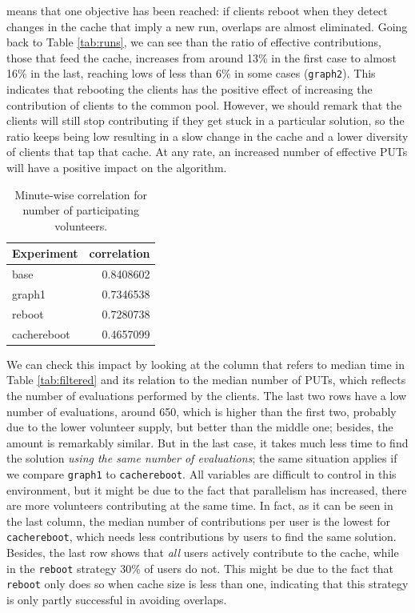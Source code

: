 \documentclass[runningheads,a4paper]{llncs}\usepackage[]{graphicx}\usepackage[]{color}
\newenvironment{knitrout}{}{} %
\begin{document}
means that one objective has been reached: if clients reboot when they
detect changes in the cache that imply a new run, overlaps are almost
eliminated. Going back to Table \ref{tab:runs}, we can see than the
ratio of effective contributions, those that feed the cache, increases
from around 13\% in the first case to almost 16\% in the last,
reaching lows of less than 6\% in some cases ({\tt graph2}). This
indicates that rebooting the clients has the positive effect of
increasing the contribution of clients to the common pool. However, we
should remark that the clients will still stop contributing if they
get stuck in a particular solution, so the ratio keeps being low
resulting in a slow change in the cache and a lower diversity of
clients that tap that cache. At any rate, an increased number of
effective PUTs will have a positive impact on the algorithm.

\begin{table}[htbp]
  \caption{Minute-wise correlation for number of participating volunteers. \label{tab:correlation}}
\begin{center}
\begin{knitrout}
\color{fgcolor}
\begin{tabular}{l|r}
\hline
Experiment & correlation\\
\hline
base & 0.8408602\\
\hline
graph1 & 0.7346538\\
\hline
reboot & 0.7280738\\
\hline
cachereboot & 0.4657099\\
\hline
\end{tabular}


\end{knitrout}
\end{center}
\end{table}
%
We can check this impact by looking at the column that refers to
median time in Table \ref{tab:filtered} and its relation to the median
number of PUTs, which reflects the number of evaluations performed by
the clients. The last two rows have a low number of evaluations,
around 650, which is higher than the first two, probably due to the
lower volunteer supply, but better than the middle one; besides, the
amount is remarkably similar. But in the last case, it takes much less
time to find the solution {\em using the same number of
  evaluations}; the same situation applies if we compare {\tt graph1}
to {\tt cachereboot}. All variables are difficult to control in this
environment, but it might be due to the fact that parallelism has
increased, there are more volunteers contributing at the same time. In
fact, as it can be seen in the last column, the median number of
contributions per user is the lowest for {\tt cachereboot}, which
needs less contributions by users to
find the same solution. Besides, the last row shows that {\em all}
users actively contribute to the cache, while in the {\tt reboot}
strategy 30\% of users do not. This might be due to the fact that {\tt
  reboot} only does so when cache size is less than one, indicating
that this strategy is only partly successful in avoiding overlaps.  
\end{document}

